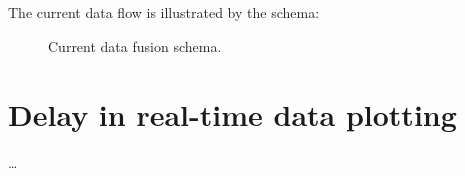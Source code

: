The current data flow is illustrated by the schema:

\begin{center}
	\begin{figure}[ht!]
		\caption{Current data fusion schema.}
	\end{figure}
\end{center}

\section{Delay in real-time data plotting}
\dots
